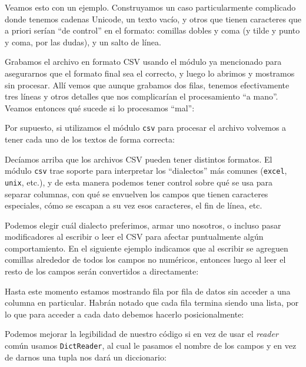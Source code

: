 Veamos esto con un ejemplo. Construyamos un caso particularmente complicado donde tenemos cadenas Unicode, un texto vacío, y otros que tienen caracteres que a priori serían ``de control'' en el formato: comillas dobles y coma (y tilde y punto y coma, por las dudas), y un salto de línea.


Grabamos el archivo en formato CSV usando el módulo ya mencionado para asegurarnos que el formato final sea el correcto, y luego lo abrimos y mostramos sin procesar. Allí vemos que aunque grabamos dos filas, tenemos efectivamente tres líneas y otros detalles que nos complicarían el procesamiento ``a mano''. Veamos entonces qué sucede si lo procesamos ``mal'':


Por supuesto, si utilizamos el módulo \texttt{csv} para procesar el archivo volvemos a tener cada uno de los textos de forma correcta:


Decíamos arriba que los archivos CSV pueden tener distintos formatos. El módulo \texttt{csv} trae soporte para interpretar los ``dialectos'' más comunes (\texttt{excel}, \texttt{unix}, etc.), y de esta manera podemos tener control sobre qué se usa para separar columnas, con qué se envuelven los campos que tienen caracteres especiales, cómo se escapan a su vez esos caracteres, el fin de línea, etc.

Podemos elegir cuál dialecto preferimos, armar uno nosotros, o incluso pasar modificadores al escribir o leer el CSV para afectar puntualmente algún comportamiento. En el siguiente ejemplo indicamos que al escribir se agreguen comillas alrededor de todos los campos no numéricos, entonces luego al leer el resto de los campos serán convertidos a  directamente:


Hasta este momento estamos mostrando fila por fila de datos sin acceder a una columna en particular. Habrán notado que cada fila termina siendo una lista, por lo que para acceder a cada dato debemos hacerlo posicionalmente:


Podemos mejorar la legibilidad de nuestro código si en vez de usar el \textit{reader} común usamos \texttt{DictReader}, al cual le pasamos el nombre de los campos y en vez de darnos una tupla nos dará un diccionario:

